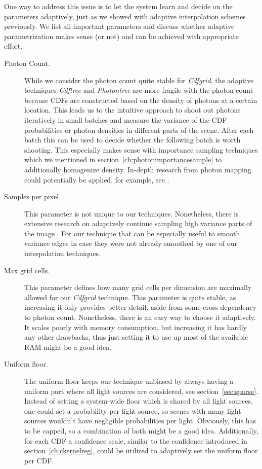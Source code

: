One way to address this issue is to let the system learn and decide on the parameters adaptively, just as we showed with adaptive interpolation schemes previously. We list all important parameters and discuss whether adaptive parametrization makes sense (or not) and can be achieved with appropriate effort.

\begin{description}
    \item[Photon Count.] While we consider the photon count quite stable for \textit{Cdfgrid}, the adaptive techniques \textit{Cdftree} and \textit{Photontree} are more fragile with the photon count because CDFs are constructed based on the density of photons at a certain location. This leads us to the intuitive approach to shoot out photons iteratively in small batches and measure the variance of the CDF probabilities or photon densities in different parts of the scene. After each batch this can be used to decide whether the following batch is worth shooting. This especially makes sense with importance sampling techniques which we mentioned in section~\ref{ch:photonimportancesample} to additionally homogenize density. In-depth research from photon mapping could potentially be applied, for example, see \parencite{DBLP:journals/vc/ZhengZ15}.
    \item[Samples per pixel.] This parameter is not unique to our techniques. Nonetheless, there is extensive research on adaptively continue sampling high variance parts of the image \parencite{zwicker15star}. For our technique that can be especially useful to smooth variance edges in case they were not already smoothed by one of our interpolation techniques.
    \item[Max grid cells.] This parameter defines how many grid cells per dimension are maximally allowed for our \textit{Cdfgrid} technique. This parameter is quite stable, as increasing it only provides better detail, aside from some cross dependency to photon count. Nonetheless, there is an easy way to choose it adaptively. It scales poorly with memory consumption, but increasing it has hardly any other drawbacks, thus just setting it to use up most of the available RAM might be a good idea.
    \item[Uniform floor.] The uniform floor keeps our technique unbiased by always having a uniform part where all light sources are considered, see section~\ref{sec:sparse}. Instead of setting a system-wide floor which is shared by all light sources, one could set a probability per light source, so scenes with many light sources wouldn't have negligible probabilities per light. Obviously, this has to be capped, so a combination of both might be a good idea. Additionally, for each CDF a confidence scale, similar to the confidence introduced in section~\ref{ch:ckernelreg}, could be utilized to adaptively set the uniform floor per CDF.

\end{description}

